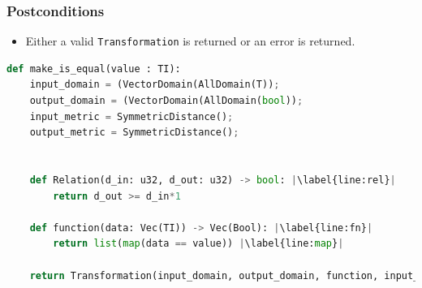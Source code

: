\documentclass[11pt,a4paper]{article}
\newcommand{\grace}[1]{{ {\color{purple}{(grace)~#1}}}}
\begin{document}
\subsubsection*{Postconditions}

\begin{itemize}
    \item Either a valid \texttt{Transformation} is returned or an error is returned.
\end{itemize}

\begin{lstlisting}[language=Python, escapechar=|]
def make_is_equal(value : TI):
    input_domain = (VectorDomain(AllDomain(T));
    output_domain = (VectorDomain(AllDomain(bool));
    input_metric = SymmetricDistance(); 
    output_metric = SymmetricDistance();
    
    
    def Relation(d_in: u32, d_out: u32) -> bool: |\label{line:rel}|
        return d_out >= d_in*1
        
    def function(data: Vec(TI)) -> Vec(Bool): |\label{line:fn}|
        return list(map(data == value)) |\label{line:map}|

    return Transformation(input_domain, output_domain, function, input_metric, output_metric, Relation)
\end{lstlisting}

\grace{ For the next round of the updates, will need to change pseudocode so that it returns the result of a make row by row transformation (which the code does). }
\end{document}
